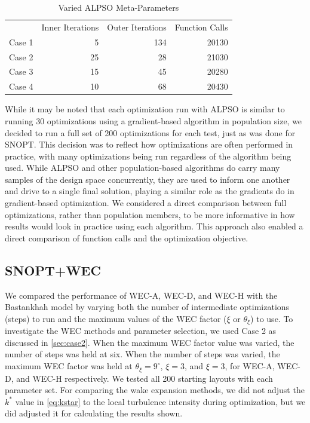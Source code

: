 \documentclass[journal abbreviation, manuscript]{copernicus}
\begin{document}
	\begin{table}[h!]
		\centering
		\caption{Varied ALPSO Meta-Parameters}
		\label{tab:alpsoparams}
		\begin{tabular}{lrrr}
			\toprule
			{} & Inner Iterations & Outer Iterations & Function Calls\\
			\cmidrule(lr){2-4}
			Case 1 &  5  & 134 & 20130 \\
			Case 2 & 25 & 28  & 21030 \\
			Case 3 & 15 & 45 & 20280 \\
			Case 4 & 10 & 68 & 20430 \\
			\bottomrule
		\end{tabular}
	\end{table}
	
	While it may be noted that each optimization run with ALPSO is similar to running 30 optimizations using a gradient-based algorithm in population size, we decided to run a full set of 200 optimizations for each test, just as was done for SNOPT. This decision was to reflect how optimizations are often performed in practice, with many optimizations being run regardless of the algorithm being used. While ALPSO and other population-based algorithms do carry many samples of the design space concurrently, they are used to inform one another and drive to a single final solution, playing a similar role as the gradients do in gradient-based optimization. We considered a direct comparison between full optimizations, rather than population members, to be more informative in how results would look in practice using each algorithm. This approach also enabled a direct comparison of function calls and the optimization objective.
	
	\subsection{SNOPT+WEC}\label{sec:bpa_wec_comparison}
	
	We compared the performance of WEC-A, WEC-D, and WEC-H with the Bastankhah  model by varying both the number of intermediate optimizations (steps) to run and the maximum values of the WEC factor ($\xi$ or $\theta_\xi$) to use. To investigate the WEC methods and parameter selection, we used Case 2 as discussed in \ref{sec:case2}. When the maximum WEC factor value was varied, the number of steps was held at six. When the number of steps was varied, the maximum WEC factor was held at $\theta_\xi = 9 ^\circ$, $\xi=3$, and $\xi=3$, for WEC-A, WEC-D, and WEC-H respectively. We tested all 200 starting layouts with each parameter set. For comparing the wake expansion methods, we did not adjust the $k^*$ value in \ref{eq:kstar} to the local turbulence intensity during optimization, but we did  adjusted it for calculating the results shown.
	
\end{document}
